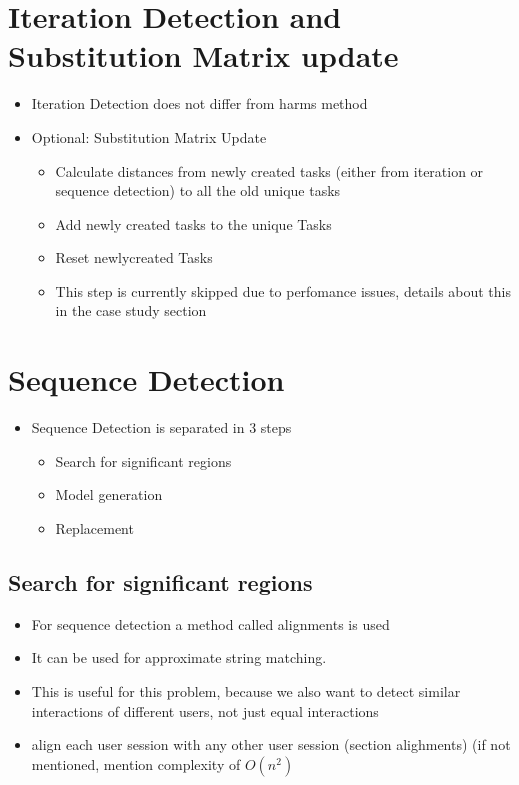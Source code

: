 \section{Iteration Detection and Substitution Matrix update}
\begin{itemize}
	\item Iteration Detection does not differ from harms method
	\item Optional: Substitution Matrix Update 
	\begin{itemize}
		\item Calculate distances from newly created tasks (either from iteration or sequence detection) to all the old unique tasks
		\item Add newly created tasks to the unique Tasks
		\item Reset newlycreated Tasks
		\item This step is currently skipped due to perfomance issues, details about this in the case study section
	\end{itemize}
\end{itemize}


\section{Sequence Detection}
\begin{itemize}
	\item Sequence Detection is separated in 3 steps
	\begin{itemize}
		\item Search for significant regions
		\item Model generation
		\item Replacement
	\end{itemize}
\end{itemize}
\subsection{Search for significant regions}		
\begin{itemize}
	\item For sequence detection a method called alignments is used
	\item It can be used for approximate string matching. 
	\item This is useful for this problem, because we also want to detect similar interactions of different users, not just equal interactions
	\item align each user session with any other user session (section alighments)  (if not mentioned, mention complexity of $O(n^2)$
\end{itemize}
